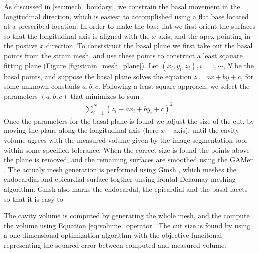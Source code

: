 As discussed in \ref{sec:mech_boudary}, we constrain the basal movement in
the longitudinal direction, which is easiest to accomplished using a flat
base located at a prescribed location. In order to make the base flat
we first orient the surfaces so that the longitudinal axis is aligned
with the $x$-axis, and the apex pointing in the postive $x$
direction. To conststruct the basal plane we first take out the basal
points from the strain mesh, and use these points to construct a least
sqauare fitting plane (Figure \ref{fig:strain_mesh_plane}). Let $(x_i, y_i, z_i), i = 1, \cdots, N$
be the basal points, and suppose the basal plane solves the equation
$z = ax + by + c$, for some unknown constants $a,b,c$. Following a
least square approach, we select the parameters $(a,b,c)$ that
minimizes to sum
\begin{align}
  \sum_{i = 1}^{N} \left( z_i - ax_i + by_i + c \right)^2.
\end{align}
Once the parameters for the basal plane is found we adjust the size of
the cut, by moving the plane along the longitudinal axis (here
$x-$axis), until the cavity volume agrees with the measured volume
given by the image segmentation tool within some specified tolerance. 
When the correct size is found the points above the plane is removed,
and the remaining surfaces are smoothed using the GAMer
\cite{yu2008feature}. The actualy mesh generation is performed using Gmsh
\cite{geuzaine2009gmsh}, which meshes the endocardial and epicardial
surface togther unsing frontal-Delaunay meshing algorithm. Gmsh also marks
the endocardal, the epicardial and the basal facets so that it is easy
to 

\begin{remark}
  The cavity volume is computed by generating the whole mesh, and the
  compute the volume using Equation \eqref{eq:volume_operator}. The cut size is
  found by using a one dimensional optimization algorithm with
  the objective funcitonal representing the squared error between
  computed and measured volume.
\end{remark}

